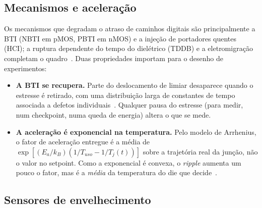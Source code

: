 \documentclass[11pt,a4paper]{article}
\begin{document}
\subsection{Mecanismos e aceleração}

Os mecanismos que degradam o atraso de caminhos digitais são principalmente a BTI (NBTI em pMOS, PBTI em nMOS) e a
injeção de portadores quentes (HCI); a ruptura dependente do tempo do dielétrico (TDDB) e a eletromigração completam o
quadro~\cite{babu2025extending,agarwal2007failure}. Duas propriedades importam para o desenho de experimentos:

\begin{itemize}
  \item \textbf{A BTI se recupera.} Parte do deslocamento de limiar desaparece quando o estresse é retirado, com uma
        distribuição larga de constantes de tempo associada a defetos individuais~\cite{grasser2010tdds}. Qualquer pausa
        do estresse (para medir, num checkpoint, numa queda de energia) altera o que se mede.
  \item \textbf{A aceleração é exponencial na temperatura.} Pelo modelo de Arrhenius, o fator de aceleração entregue é a
        média de $\exp[(E_a/k_B)(1/T_{uso}-1/T_j(t))]$ sobre a trajetória real da junção, não o valor no setpoint. Como
        a exponencial é convexa, o \emph{ripple} aumenta um pouco o fator, mas é a \emph{média} da temperatura do die
        que decide~\cite{alencar2026sbcci}.
\end{itemize}

\subsection{Sensores de envelhecimento}
\end{document}

